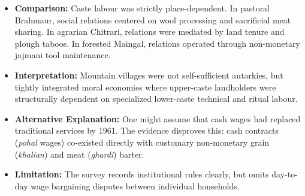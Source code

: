 \documentclass[11pt,a4paper]{article}
\begin{document}
\begin{itemize}[leftmargin=*]
\begin{enumerate}
        \item \textit{Lohars in Maingal (pp.~12, 33):} Two Lohar households (8 persons) maintain workshops fabricating and repairing iron ploughshares. In return, they receive non-monetary \textbf{khalian} fixed customary sheaves of unhusked grain delivered directly from the threshing floor (\textit{khala}) at each harvest.
    \end{enumerate}
    \item \textbf{Comparison:} Caste labour was strictly place-dependent. In pastoral Brahmaur, social relations centered on wool processing and sacrificial meat sharing. In agrarian Chitrari, relations were mediated by land tenure and plough taboos. In forested Maingal, relations operated through non-monetary jajmani tool maintenance.
    \item \textbf{Interpretation:} Mountain villages were not self-sufficient autarkies, but tightly integrated moral economies where upper-caste landholders were structurally dependent on specialized lower-caste technical and ritual labour.
    \item \textbf{Alternative Explanation:} One might assume that cash wages had replaced traditional services by 1961. The evidence disproves this: cash contracts (\textit{pohal} wages) co-existed directly with customary non-monetary grain (\textit{khalian}) and meat (\textit{ghardi}) barter.
    \item \textbf{Limitation:} The survey records institutional rules clearly, but omits day-to-day wage bargaining disputes between individual households.
\end{itemize}
\end{document}
